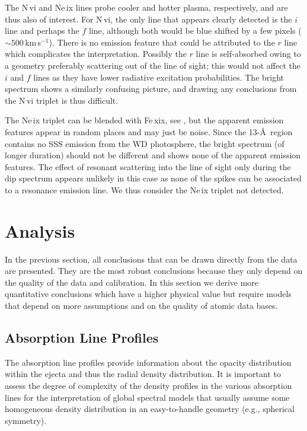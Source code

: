 \documentclass{aa}
\begin{document}
The N\,{\sc vi} and Ne\,{\sc ix} lines probe cooler and hotter plasma,
respectively, and are thus also of interest. For N\,{\sc vi}, the only
line that appears clearly detected is the $i$ line and perhaps the $f$ line,
although both would be blue shifted by a few pixels ($\sim 500$\,km\,s$^{-1}$).
There is no emission feature that could be attributed to the $r$ line which
complicates the interpretation. Possibly the $r$ line is self-absorbed owing to
a geometry preferably scattering out of the line of sight; this would not
affect the $i$ and $f$ lines as they have lower radiative excitation
probabilities. The bright spectrum shows a similarly confusing picture,
and drawing any conclusions from the N\,{\sc vi} triplet is thus difficult.

The Ne\,{\sc ix} triplet can be blended with Fe\,{\sc xix}, see
\cite{nebr}, but the apparent emission features appear in random places and
may just be noise. Since the 13-\AA\ region contains no SSS emission from
the WD photosphere, the bright spectrum (of longer duration) should not
be different and shows none of the apparent emission features. The effect
of resonant scattering into the line of sight only during the dip spectrum
appears unlikely in this case as none of the spikes can be associated to
a resonance emission line. We thus consider the Ne\,{\sc ix} triplet not
detected.

\section{Analysis}
\label{sect:analysis}

In the previous section, all conclusions that can be drawn directly from
the data are presented. They are the most robust conclusions because
they only depend on the quality of the data and calibration. In this
section we derive more quantitative conclusions which have a higher
physical value but require models that depend on more
assumptions and on the quality of atomic data bases.

\subsection{Absorption Line Profiles}
\label{sect:analysis:lprofiles}

The absorption line profiles provide information about the opacity distribution
within the ejecta and thus the radial density distribution. It is important to
assess the degree of complexity of the density profiles in the various absorption
lines for the interpretation of global spectral models that usually assume some
homogeneous density distribution in an easy-to-handle geometry (e.g., spherical
symmetry).\\
\end{document}
